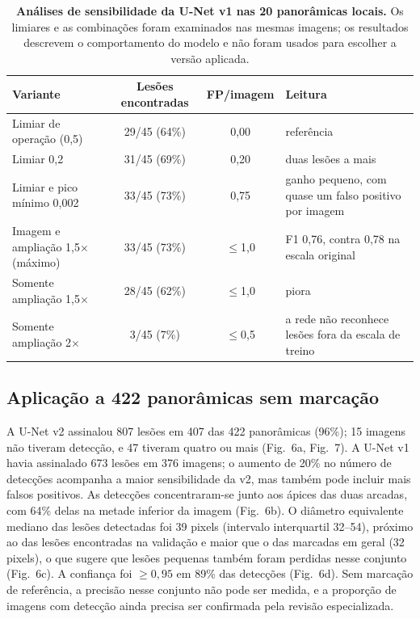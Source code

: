 \documentclass[twocolumn]{article}
\begin{document}
\begin{table}[!t]
\caption{\textbf{Análises de sensibilidade da U-Net v1 nas 20 panorâmicas locais.} Os limiares e as combinações foram examinados nas mesmas imagens; os resultados descrevem o comportamento do modelo e não foram usados para escolher a versão aplicada.}
\centering\tablefont
\begin{tabularx}{\textwidth}{>{\RaggedRight\arraybackslash}p{52mm} c c L}
\toprule
Variante & Lesões encontradas & FP/imagem & Leitura \\
\midrule
Limiar de operação (0,5) & 29/45 (64\%) & 0,00 & referência \\
Limiar 0,2 & 31/45 (69\%) & 0,20 & duas lesões a mais \\
Limiar e pico mínimo 0,002 & 33/45 (73\%) & 0,75 & ganho pequeno, com quase um falso positivo por imagem \\
Imagem e ampliação 1,5$\times$ (máximo) & 33/45 (73\%) & $\leq$1,0 & F1 0,76, contra 0,78 na escala original \\
Somente ampliação 1,5$\times$ & 28/45 (62\%) & $\leq$1,0 & piora \\
Somente ampliação 2$\times$ & 3/45 (7\%) & $\leq$0,5 & a rede não reconhece lesões fora da escala de treino \\
\bottomrule
\end{tabularx}
\end{table}

\subsection{Aplicação a 422 panorâmicas sem marcação}

A U-Net v2 assinalou 807 lesões em 407 das 422 panorâmicas (96\%); 15 imagens não tiveram detecção, e 47 tiveram quatro ou mais (Fig.~6a, Fig.~7). A U-Net v1 havia assinalado 673 lesões em 376 imagens; o aumento de 20\% no número de detecções acompanha a maior sensibilidade da v2, mas também pode incluir mais falsos positivos. As detecções concentraram-se junto aos ápices das duas arcadas, com 64\% delas na metade inferior da imagem (Fig.~6b). O diâmetro equivalente mediano das lesões detectadas foi 39 pixels (intervalo interquartil 32--54), próximo ao das lesões encontradas na validação e maior que o das marcadas em geral (32 pixels), o que sugere que lesões pequenas também foram perdidas nesse conjunto (Fig.~6c). A confiança foi $\geq 0{,}95$ em 89\% das detecções (Fig.~6d). Sem marcação de referência, a precisão nesse conjunto não pode ser medida, e a proporção de imagens com detecção ainda precisa ser confirmada pela revisão especializada.
\end{document}
